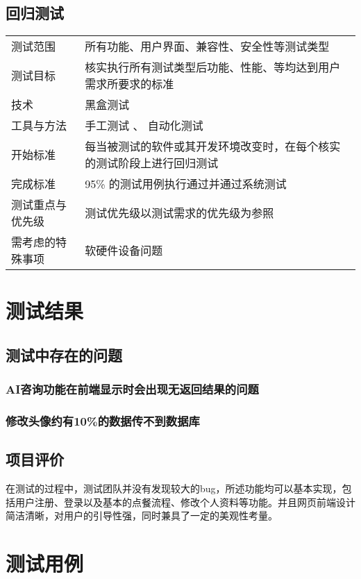 \subsection{回归测试}

\begin{longtable}[]{@{}ll@{}}
\toprule
测试范围 & 所有功能、用户界面、兼容性、安全性等测试类型\tabularnewline
测试目标 &
核实执行所有测试类型后功能、性能、等均达到用户需求所要求的标准\tabularnewline
技术 & 黑盒测试\tabularnewline
工具与方法 & 手工测试 、 自动化测试\tabularnewline
开始标准 &
每当被测试的软件或其开发环境改变时，在每个核实的测试阶段上进行回归测试\tabularnewline
完成标准 & 95\% 的测试用例执行通过并通过系统测试\tabularnewline
测试重点与优先级 & 测试优先级以测试需求的优先级为参照\tabularnewline
需考虑的特殊事项 & 软硬件设备问题\tabularnewline
\bottomrule
\end{longtable}

\section{测试结果}

\subsection{测试中存在的问题}

\subsubsection{AI咨询功能在前端显示时会出现无返回结果的问题}

\subsubsection{修改头像约有10\%的数据传不到数据库}


\subsection{项目评价}


  在测试的过程中，测试团队并没有发现较大的bug，所述功能均可以基本实现，包括用户注册、登录以及基本的点餐流程、修改个人资料等功能。并且网页前端设计简洁清晰，对用户的引导性强，同时兼具了一定的美观性考量。
\section{测试用例}
